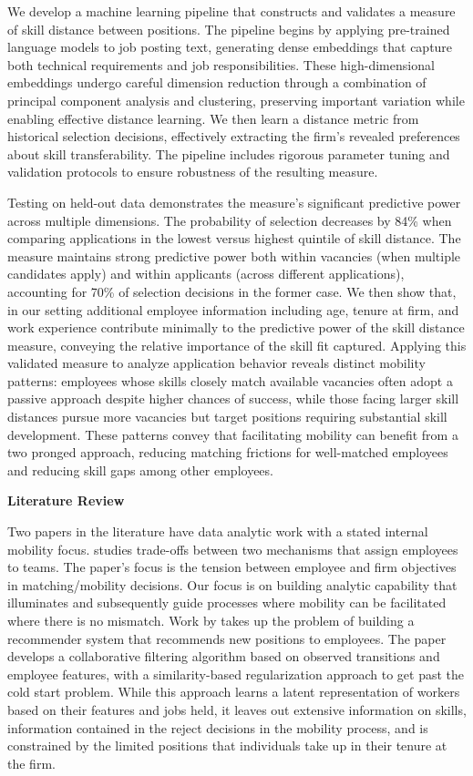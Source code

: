 \documentclass{article}
\begin{document}
We develop a machine learning pipeline that constructs and validates a measure of skill distance between positions. The pipeline begins by applying pre-trained language models to job posting text, generating dense embeddings that capture both technical requirements and job responsibilities. These high-dimensional embeddings undergo careful dimension reduction through a combination of principal component analysis and clustering, preserving important variation while enabling effective distance learning. We then learn a distance metric from historical selection decisions, effectively extracting the firm's revealed preferences about skill transferability. The pipeline includes rigorous parameter tuning and validation protocols to ensure robustness of the resulting measure.

Testing on held-out data demonstrates the measure's significant predictive power across multiple dimensions. The probability of selection decreases by 84\% when comparing applications in the lowest versus highest quintile of skill distance. The measure maintains strong predictive power both within vacancies (when multiple candidates apply) and within applicants (across different applications), accounting for 70\% of selection decisions in the former case. We then show that, in our setting additional employee information including age, tenure at firm, and work experience contribute minimally to the predictive power of the skill distance measure, conveying the relative importance of the skill fit captured. Applying this validated measure to analyze application behavior reveals distinct mobility patterns: employees whose skills closely match available vacancies often adopt a passive approach despite higher chances of success, while those facing larger skill distances pursue more vacancies but target positions requiring substantial skill development. These patterns convey that facilitating mobility can benefit from a two pronged approach, reducing matching frictions for well-matched employees and reducing skill gaps among other employees. 




\textbf{Literature Review}

Two papers in the literature have data analytic work with a stated internal mobility focus. \textcite{2024_Cowgill} studies trade-offs between two mechanisms that assign employees to teams. The paper’s focus is the tension between employee and firm objectives in matching/mobility decisions. Our focus is on building analytic capability that illuminates and subsequently guide processes where mobility can be facilitated where there is no mismatch. Work by \textcite{devos2024data} takes up the problem of building a recommender system that recommends new positions to employees. The paper develops a collaborative filtering algorithm based on observed transitions and employee features, with a similarity-based regularization approach to get past the cold start problem. While this approach learns a latent representation of workers based on their features and jobs held, it leaves out extensive information on skills, information contained in the reject decisions in the mobility process, and is constrained by the limited positions that individuals take up in their tenure at the firm. 
\end{document}

